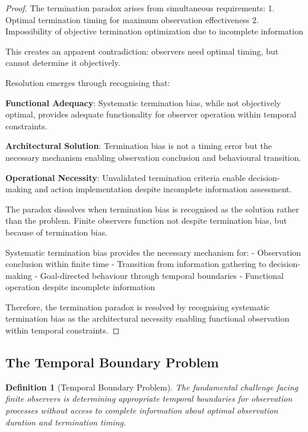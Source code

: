 \documentclass[12pt,a4paper]{article}
\newtheorem{definition}[theorem]{Definition}
\begin{document}
\begin{proof}
The termination paradox arises from simultaneous requirements:
1. Optimal termination timing for maximum observation effectiveness
2. Impossibility of objective termination optimization due to incomplete information

This creates an apparent contradiction: observers need optimal timing, but cannot determine it objectively.

Resolution emerges through recognising that:

\textbf{Functional Adequacy}: Systematic termination bias, while not objectively optimal, provides adequate functionality for observer operation within temporal constraints.

\textbf{Architectural Solution}: Termination bias is not a timing error but the necessary mechanism enabling observation conclusion and behavioural transition.

\textbf{Operational Necessity}: Unvalidated termination criteria enable decision-making and action implementation despite incomplete information assessment.

The paradox dissolves when termination bias is recognised as the solution rather than the problem. Finite observers function not despite termination bias, but because of termination bias.

Systematic termination bias provides the necessary mechanism for:
- Observation conclusion within finite time
- Transition from information gathering to decision-making
- Goal-directed behaviour through temporal boundaries
- Functional operation despite incomplete information

Therefore, the termination paradox is resolved by recognising systematic termination bias as the architectural necessity enabling functional observation within temporal constraints.
\end{proof}

\subsection{The Temporal Boundary Problem}

\begin{definition}[Temporal Boundary Problem]
The fundamental challenge facing finite observers is determining appropriate temporal boundaries for observation processes without access to complete information about optimal observation duration and termination timing.
\end{definition}
\end{document}

